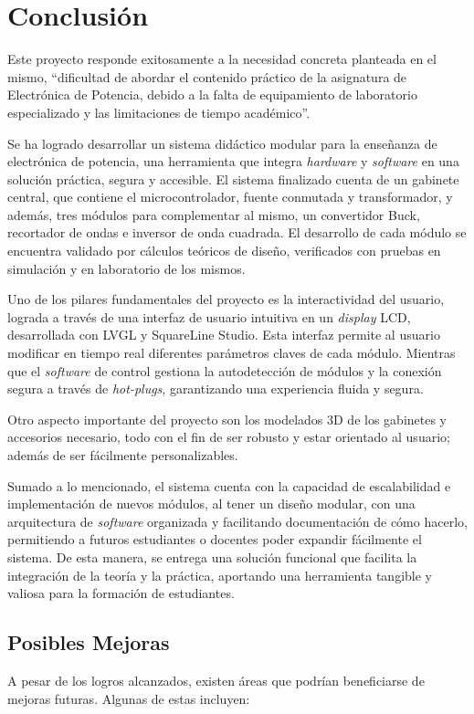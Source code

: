 \section{Conclusión}
\justifying
\vspace{-0.2cm}
Este proyecto responde exitosamente a la necesidad concreta planteada en el mismo, ``dificultad de abordar el contenido práctico de la asignatura de Electrónica de Potencia, debido a la falta de equipamiento de laboratorio especializado y las limitaciones de tiempo académico''.

Se ha logrado desarrollar un sistema didáctico modular para la enseñanza de electrónica de potencia, una herramienta que integra \textit{hardware} y \textit{software} en una solución práctica, segura y accesible. El sistema finalizado cuenta de un gabinete central, que contiene el microcontrolador, fuente conmutada y transformador, y además, tres módulos para complementar al mismo, un convertidor Buck, recortador de ondas e inversor de onda cuadrada. El desarrollo de cada módulo se encuentra validado por cálculos teóricos de diseño, verificados con pruebas en simulación y en laboratorio de los mismos.

Uno de los pilares fundamentales del proyecto es la interactividad del usuario, lograda a través de una interfaz de usuario intuitiva en un \textit{display} LCD, desarrollada con LVGL y SquareLine Studio. Esta interfaz permite al usuario modificar en tiempo real diferentes parámetros claves de cada módulo. Mientras que el \textit{software} de control gestiona la autodetección de módulos y la conexión segura a través de \textit{hot-plugs}, garantizando una experiencia fluida y segura.

Otro aspecto importante del proyecto son los modelados 3D de los gabinetes y accesorios necesario, todo con el fin de ser robusto y estar orientado al usuario; además de ser fácilmente personalizables.

Sumado a lo mencionado, el sistema cuenta con la capacidad de escalabilidad e implementación de nuevos módulos, al tener un diseño modular, con una arquitectura de \textit{software} organizada y facilitando documentación de cómo hacerlo, permitiendo a futuros estudiantes o docentes poder expandir fácilmente el sistema. De esta manera, se entrega una solución funcional que facilita la integración de la teoría y la práctica, aportando una herramienta tangible y valiosa para la formación de estudiantes.
\vspace{-0.3cm}
\subsection{Posibles Mejoras}
\vspace{-0.1cm}
A pesar de los logros alcanzados, existen áreas que podrían beneficiarse de mejoras futuras. Algunas de estas incluyen:

